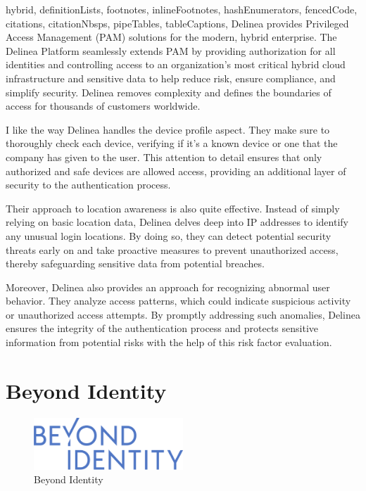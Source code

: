 \documentclass[
  digital,     %
  oneside,     %
  nosansbold,  %
  nocolorbold, %
  lof,         %
  lot,         %
]{fithesis4}
\begin{document}
\begin{markdown*}{%
  hybrid,
  definitionLists,
  footnotes,
  inlineFootnotes,
  hashEnumerators,
  fencedCode,
  citations,
  citationNbsps,
  pipeTables,
  tableCaptions,
}
Delinea provides Privileged Access Management (PAM) solutions for the modern, hybrid enterprise.
The Delinea Platform seamlessly extends PAM by providing authorization for all identities and controlling access to an organization’s most critical hybrid cloud infrastructure and sensitive data to help reduce risk, ensure compliance, and simplify security.
Delinea removes complexity and defines the boundaries of access for thousands of customers worldwide.

I like the way Delinea handles the device profile aspect.
They make sure to thoroughly check each device, verifying if it's a known device or one that the company has given to the user. This attention to detail ensures that only authorized and safe devices are allowed access, providing an additional layer of security to the authentication process.

Their approach to location awareness is also quite effective.
Instead of simply relying on basic location data, Delinea delves deep into IP addresses to identify any unusual login locations. By doing so, they can detect potential security threats early on and take proactive measures to prevent unauthorized access, thereby safeguarding sensitive data from potential breaches.

Moreover, Delinea also provides an approach for recognizing abnormal user behavior.
They analyze access patterns, which could indicate suspicious activity or unauthorized access attempts.
By promptly addressing such anomalies, Delinea ensures the integrity of the authentication process and protects sensitive information from potential risks with the help of this risk factor evaluation. \cite{existing-delinea}


\section{Beyond Identity}

\begin{figure}[htbp]
  \centering
  \includegraphics[width=0.5\textwidth]{img/BeyondIdentity-logo.png}
  \caption{Beyond Identity}
  \label{fig:beyond-identity-logo}
\end{figure}


\end{markdown*}
\end{document}
